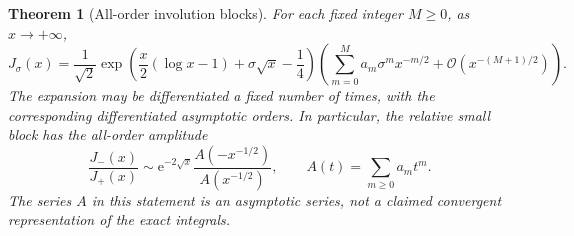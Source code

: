\documentclass[11pt,a4paper]{article}
\newtheorem{theorem}{Theorem}[section]
\theoremstyle{definition}
\theoremstyle{remark}
\newcommand{\ee}{\mathrm e}
\newcommand{\OO}{\mathcal O}
\numberwithin{equation}{section}
\begin{document}
\begin{theorem}[All-order involution blocks]
\label{thm:ivforward}
For each fixed integer $M\ge0$, as $x\to+\infty$,
\begin{equation}
 J_\sigma(x)=\frac1{\sqrt2}
 \exp\left(\frac x2(\log x-1)+\sigma\sqrt x-\frac14\right)
 \left(\sum_{m=0}^M a_m\sigma^m x^{-m/2}
 +\OO(x^{-(M+1)/2})\right).
 \label{eq:ivforward}
\end{equation}
The expansion may be differentiated a fixed number of times, with the corresponding differentiated asymptotic orders. In particular, the relative small block has the all-order amplitude
\begin{equation}
 \frac{J_-(x)}{J_+(x)}\sim
 \ee^{-2\sqrt x}\frac{A(-x^{-1/2})}{A(x^{-1/2})},
 \qquad A(t)=\sum_{m\ge0}a_mt^m.
 \label{eq:ivratio}
\end{equation}
The series $A$ in this statement is an asymptotic series, not a claimed convergent representation of the exact integrals.
\end{theorem}
\end{document}

